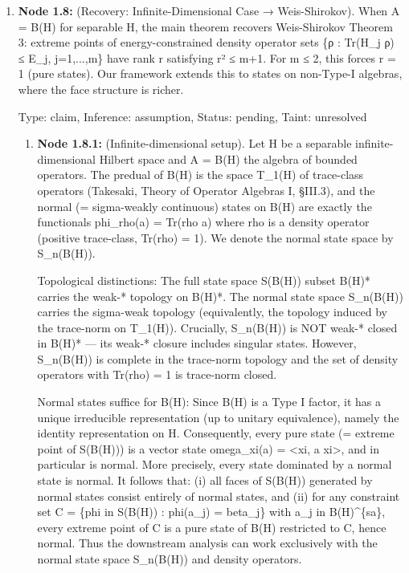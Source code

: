 \documentclass{article}
\begin{document}
\begin{enumerate}
\begin{enumerate}
  Type: claim, Inference: assumption, Status: pending, Taint: unresolved

\end{enumerate}
\item \textbf{Node 1.8:} (Recovery: Infinite-Dimensional Case → Weis-Shirokov). When A = B(H) for separable H, the main theorem recovers Weis-Shirokov Theorem 3: extreme points of energy-constrained density operator sets \{ρ : Tr(H\_j ρ) ≤ E\_j, j=1,...,m\} have rank r satisfying r² ≤ m+1. For m ≤ 2, this forces r = 1 (pure states). Our framework extends this to states on non-Type-I algebras, where the face structure is richer.

  Type: claim, Inference: assumption, Status: pending, Taint: unresolved

\begin{enumerate}
\item \textbf{Node 1.8.1:} (Infinite-dimensional setup). Let H be a separable infinite-dimensional Hilbert space and A = B(H) the algebra of bounded operators. The predual of B(H) is the space T\_1(H) of trace-class operators (Takesaki, Theory of Operator Algebras I, §III.3), and the normal (= sigma-weakly continuous) states on B(H) are exactly the functionals phi\_rho(a) = Tr(rho a) where rho is a density operator (positive trace-class, Tr(rho) = 1). We denote the normal state space by S\_n(B(H)).

Topological distinctions: The full state space S(B(H)) subset B(H)* carries the weak-* topology on B(H)*. The normal state space S\_n(B(H)) carries the sigma-weak topology (equivalently, the topology induced by the trace-norm on T\_1(H)). Crucially, S\_n(B(H)) is NOT weak-* closed in B(H)* --- its weak-* closure includes singular states. However, S\_n(B(H)) is complete in the trace-norm topology and the set of density operators with Tr(rho) = 1 is trace-norm closed.

Normal states suffice for B(H): Since B(H) is a Type I factor, it has a unique irreducible representation (up to unitary equivalence), namely the identity representation on H. Consequently, every pure state (= extreme point of S(B(H))) is a vector state omega\_xi(a) = <xi, a xi>, and in particular is normal. More precisely, every state dominated by a normal state is normal. It follows that: (i) all faces of S(B(H)) generated by normal states consist entirely of normal states, and (ii) for any constraint set C = \{phi in S(B(H)) : phi(a\_j) = beta\_j\} with a\_j in B(H)\textasciicircum{}\{sa\}, every extreme point of C is a pure state of B(H) restricted to C, hence normal. Thus the downstream analysis can work exclusively with the normal state space S\_n(B(H)) and density operators.


\end{enumerate}
\end{enumerate}
\end{document}

